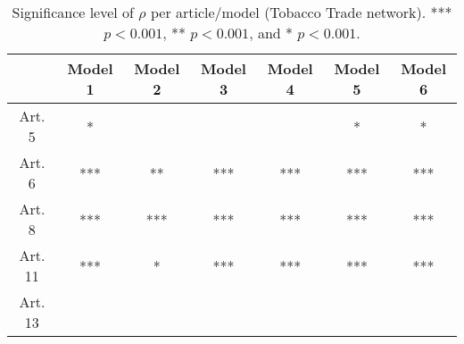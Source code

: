 \begin{table}[ht]
\centering
\begin{tabular}{ccccccc}
  \toprule
 & Model 1 & Model 2 & Model 3 & Model 4 & Model 5 & Model 6 \\ 
  \midrule
Art. 5 & * &   &   &   & * & * \\ 
   \midrule
Art. 6 & *** & ** & *** & *** & *** & *** \\ 
   \midrule
Art. 8 & *** & *** & *** & *** & *** & *** \\ 
   \midrule
Art. 11 & *** & * & *** & *** & *** & *** \\ 
   \midrule
Art. 13 &   &   &   &   &   &   \\ 
   \bottomrule
\end{tabular}
\caption{Significance level of $\rho$ per article/model (Tobacco Trade network). *** $p < 0.001$, ** $p < 0.001$, and * $p < 0.001$.} 
\end{table}
